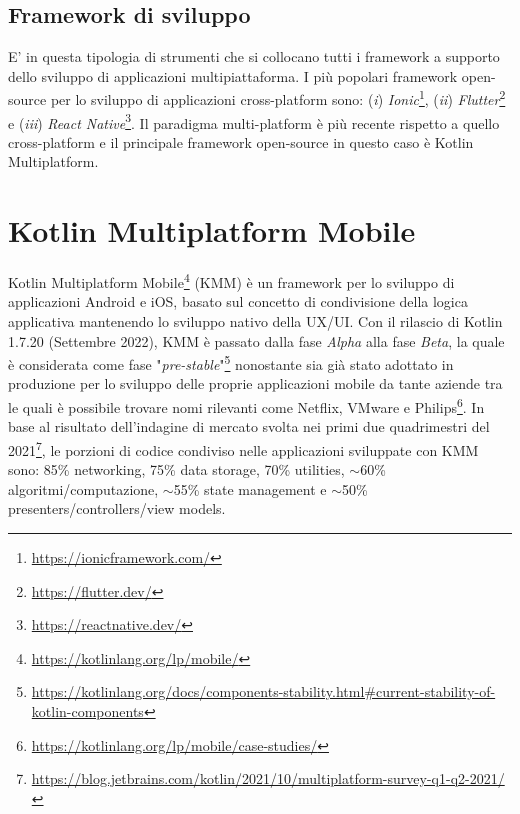 \subsection*{Framework di sviluppo}
E' in questa tipologia di strumenti che si collocano tutti i framework a supporto dello sviluppo di applicazioni multipiattaforma.
I più popolari framework open-source per lo sviluppo di applicazioni cross-platform sono: 
(\textit{i}) \textit{Ionic}\footnote{\href{https://ionicframework.com/}{https://ionicframework.com/}}, 
(\textit{ii}) \textit{Flutter}\footnote{\href{https://flutter.dev/}{https://flutter.dev/}} e (\textit{iii}) \textit{React Native}\footnote{\href{https://reactnative.dev/}{https://reactnative.dev/}}. 
Il paradigma multi-platform è più recente rispetto a quello cross-platform e il principale framework open-source in questo caso è Kotlin Multiplatform.

\section{Kotlin Multiplatform Mobile}
Kotlin Multiplatform Mobile\footnote{\href{https://kotlinlang.org/lp/mobile/}{https://kotlinlang.org/lp/mobile/}} (KMM) è un framework per lo sviluppo di applicazioni Android e iOS,
basato sul concetto di condivisione della logica applicativa mantenendo lo sviluppo nativo della UX/UI.
Con il rilascio di Kotlin 1.7.20 (Settembre 2022), 
KMM è passato dalla fase \textit{Alpha} alla fase \textit{Beta},
la quale è considerata come fase "\textit{pre-stable}"\footnote{\href{https://kotlinlang.org/docs/components-stability.html\#current-stability-of-kotlin-components}{https://kotlinlang.org/docs/components-stability.html\#current-stability-of-kotlin-components}} nonostante sia già stato adottato in produzione per lo sviluppo delle proprie applicazioni mobile da tante aziende tra le quali è possibile trovare nomi rilevanti come Netflix, 
VMware e Philips\footnote{\href{https://kotlinlang.org/lp/mobile/case-studies/}{https://kotlinlang.org/lp/mobile/case-studies/}}. 
In base al risultato dell'indagine di mercato svolta nei primi due quadrimestri del 2021\footnote{\href{https://blog.jetbrains.com/kotlin/2021/10/multiplatform-survey-q1-q2-2021/}{https://blog.jetbrains.com/kotlin/2021/10/multiplatform-survey-q1-q2-2021/}}, 
le porzioni di codice condiviso nelle applicazioni sviluppate con KMM sono: 
85\% networking, 
75\% data storage, 
70\% utilities, 
$\sim$60\% algoritmi/computazione, 
$\sim$55\% state management e 
$\sim$50\% presenters/controllers/view models.

